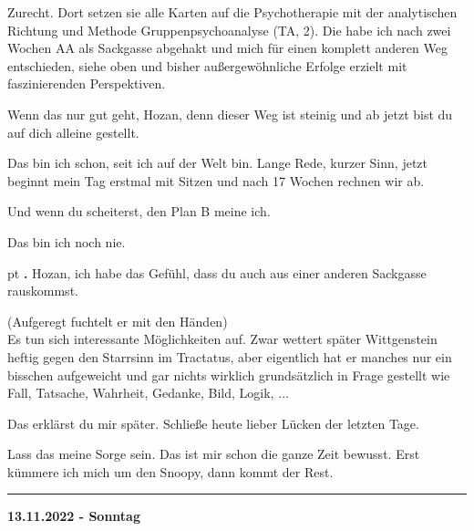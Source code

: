 \documentclass[10pt,a4paper]{article}
\newcounter{notec}
\newcommand\notep[1]{%
  \stepcounter{notec}
  \vskip #1pt
  {\bf\arabic{notec}.}
}
\newcommand\rele[1] {{\color {english} \bf {#1}}}              %
\newcommand\ddivide {\vskip -9pt \hrule \vskip 6pt}
\begin{document}
\begin{mdframed}[style=daystyle]
  \vskip 2pt
  Zurecht. Dort setzen sie alle Karten auf die Psychotherapie mit der
  analytischen Richtung und Methode Gruppenpsychoanalyse (TA, 2). Die habe ich
  nach zwei Wochen AA als Sackgasse abgehakt und mich für einen komplett anderen
  Weg entschieden, siehe oben und bisher außergewöhnliche Erfolge erzielt mit
  faszinierenden Perspektiven.

  \vskip 2pt
  Wenn das nur gut geht, Hozan, denn dieser Weg ist steinig und ab jetzt bist du
  auf dich alleine gestellt.

  \vskip 2pt
  Das bin ich schon, seit ich auf der Welt bin. Lange Rede, kurzer Sinn, jetzt
  beginnt mein Tag erstmal mit Sitzen und nach 17 Wochen rechnen wir ab.

  \vskip 2pt
  Und wenn du scheiterst, den Plan B meine ich.

  \vskip 2pt
  Das bin ich noch nie.


  \notep 4 Hozan, ich habe das Gefühl, dass du auch aus einer anderen Sackgasse
  rauskommst.

  \vskip 2pt
  (Aufgeregt fuchtelt er mit den Händen) \\
  Es tun sich interessante Möglichkeiten auf. Zwar wettert später Wittgenstein
  heftig gegen den Starrsinn im Tractatus, aber eigentlich hat er manches nur
  ein bisschen aufgeweicht und gar nichts wirklich grundsätzlich in Frage
  gestellt wie Fall, Tatsache, Wahrheit, Gedanke, Bild, Logik, $\ldots$

  \vskip 2pt
  Das erklärst du mir später. Schließe heute lieber Lücken der letzten Tage.

  \vskip 2pt
  Lass das meine Sorge sein. Das ist mir schon die ganze Zeit bewusst. Erst
  kümmere ich mich um den Snoopy, dann kommt der Rest.

\end{mdframed}


\ddivide
{\rele {13.11.2022 - Sonntag}}
\end{document}
